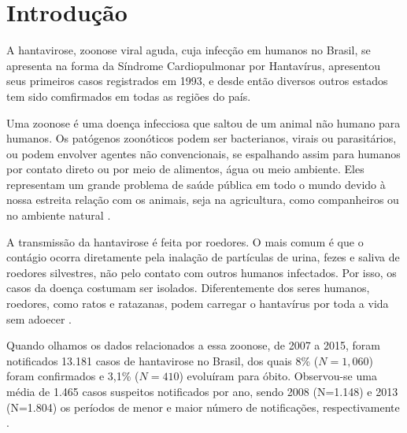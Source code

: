 \documentclass[
	12pt,				%
	openright,			%
	oneside,			%
	a4paper,			%
	brazil				%
	]{abntex2}
\begin{document}
\tableofcontents*
\cleardoublepage


\textual

\hypertarget{introduuxe7uxe3o}{%
\chapter{Introdução}\label{introduuxe7uxe3o}}

\bigskip

A hantavirose, zoonose viral aguda, cuja infecção em humanos no Brasil, se apresenta na forma da Síndrome Cardiopulmonar por Hantavírus, apresentou seus primeiros casos registrados em 1993, e desde então diversos outros estados tem sido comfirmados em todas as regiões do país.

Uma zoonose é uma doença infecciosa que saltou de um animal não humano para humanos. Os patógenos zoonóticos podem ser bacterianos, virais ou parasitários, ou podem envolver agentes não convencionais, se espalhando assim para humanos por contato direto ou por meio de alimentos, água ou meio ambiente. Eles representam um grande problema de saúde pública em todo o mundo devido à nossa estreita relação com os animais, seja na agricultura, como companheiros ou no ambiente natural \cite{OMS_zoonoses}.

A transmissão da hantavirose é feita por roedores. O mais comum é que o contágio ocorra diretamente pela inalação de partículas de urina, fezes e saliva de roedores silvestres, não pelo contato com outros humanos infectados. Por isso, os casos da doença costumam ser isolados. Diferentemente dos seres humanos, roedores, como ratos e ratazanas, podem carregar o hantavírus por toda a vida sem adoecer \cite{bbc}.

Quando olhamos os dados relacionados a essa zoonose, de 2007 a 2015, foram notificados 13.181 casos de hantavirose no Brasil, dos quais 8\% (\(N=1,060\)) foram confirmados e 3,1\% (\(N=410\)) evoluíram para óbito. Observou-se uma média de 1.465 casos suspeitos notificados por ano, sendo 2008 (N=1.148) e 2013 (N=1.804) os períodos de menor e maior número de notificações, respectivamente \cite{Para2018}.
\end{document}
